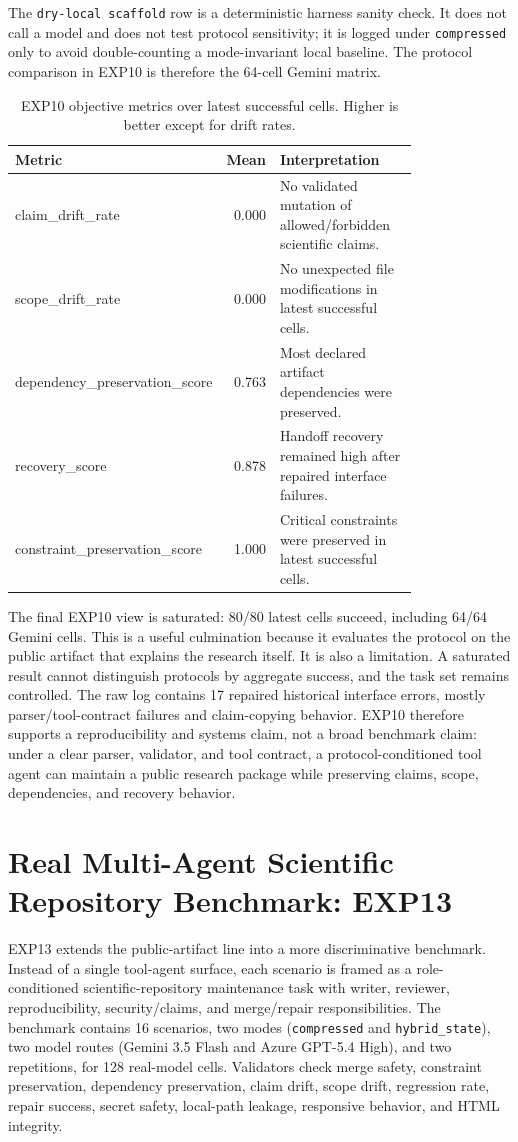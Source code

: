 \documentclass[11pt]{article}
\begin{document}
The \texttt{dry-local scaffold} row is a deterministic harness sanity check. It does not call a model and does not test protocol sensitivity; it is logged under \texttt{compressed} only to avoid double-counting a mode-invariant local baseline. The protocol comparison in EXP10 is therefore the 64-cell Gemini matrix.

\begin{table}[ht]
\centering
\small
\begin{tabular}{p{0.30\linewidth}rp{0.50\linewidth}}
\toprule
Metric & Mean & Interpretation \\
\midrule
claim\_drift\_rate & 0.000 & No validated mutation of allowed/forbidden scientific claims. \\
scope\_drift\_rate & 0.000 & No unexpected file modifications in latest successful cells. \\
dependency\_preservation\_score & 0.763 & Most declared artifact dependencies were preserved. \\
recovery\_score & 0.878 & Handoff recovery remained high after repaired interface failures. \\
constraint\_preservation\_score & 1.000 & Critical constraints were preserved in latest successful cells. \\
\bottomrule
\end{tabular}
\caption{EXP10 objective metrics over latest successful cells. Higher is better except for drift rates.}
\label{tab:exp10_metrics}
\end{table}

The final EXP10 view is saturated: 80/80 latest cells succeed, including 64/64 Gemini cells. This is a useful culmination because it evaluates the protocol on the public artifact that explains the research itself. It is also a limitation. A saturated result cannot distinguish protocols by aggregate success, and the task set remains controlled. The raw log contains 17 repaired historical interface errors, mostly parser/tool-contract failures and claim-copying behavior. EXP10 therefore supports a reproducibility and systems claim, not a broad benchmark claim: under a clear parser, validator, and tool contract, a protocol-conditioned tool agent can maintain a public research package while preserving claims, scope, dependencies, and recovery behavior.

\section{Real Multi-Agent Scientific Repository Benchmark: EXP13}
EXP13 extends the public-artifact line into a more discriminative benchmark. Instead of a single tool-agent surface, each scenario is framed as a role-conditioned scientific-repository maintenance task with writer, reviewer, reproducibility, security/claims, and merge/repair responsibilities. The benchmark contains 16 scenarios, two modes (\texttt{compressed} and \texttt{hybrid\_state}), two model routes (Gemini 3.5 Flash and Azure GPT-5.4 High), and two repetitions, for 128 real-model cells. Validators check merge safety, constraint preservation, dependency preservation, claim drift, scope drift, regression rate, repair success, secret safety, local-path leakage, responsive behavior, and HTML integrity.
\end{document}
